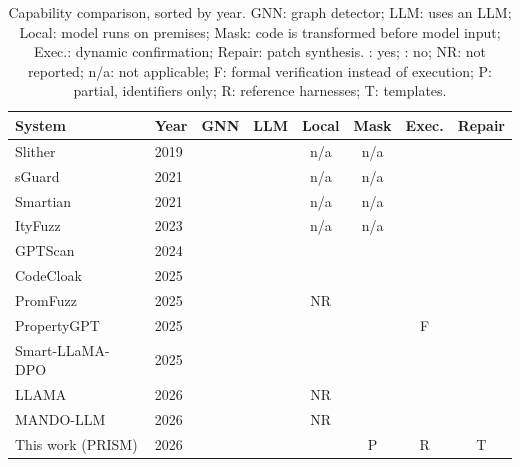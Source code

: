 \documentclass[runningheads]{llncs}
\newcommand{\cmark}{\ding{51}}
\newcommand{\xmark}{\ding{55}}
\begin{document}
\begin{table}[!b]
\centering
\small
\caption{Capability comparison, sorted by year. GNN: graph detector; LLM: uses an LLM; Local: model runs on premises; Mask: code is transformed before model input; Exec.: dynamic confirmation; Repair: patch synthesis. \cmark: yes; \xmark: no; NR: not reported; n/a: not applicable; F: formal verification instead of execution; P: partial, identifiers only; R: reference harnesses; T: templates.}
\label{tab:positioning}
\setlength{\tabcolsep}{4.5pt}
\begin{tabular}{llcccccc}
\toprule
System & Year & GNN & LLM & Local & Mask & Exec. & Repair \\
\midrule
Slither~\cite{feist2019slither}          & 2019 & \xmark & \xmark & n/a & n/a & \xmark & \xmark \\
sGuard~\cite{nguyen2021sguard}           & 2021 & \xmark & \xmark & n/a & n/a & \xmark & \cmark \\
Smartian~\cite{choi2021smartian}         & 2021 & \xmark & \xmark & n/a & n/a & \cmark & \xmark \\
ItyFuzz~\cite{shou2023ityfuzz}           & 2023 & \xmark & \xmark & n/a & n/a & \cmark & \xmark \\
GPTScan~\cite{sun2024gptscan}            & 2024 & \xmark & \cmark & \xmark & \xmark & \xmark & \xmark \\
CodeCloak~\cite{noah2025codecloak}    & 2025 & \xmark & \cmark & \xmark & \cmark & \xmark & \xmark \\
PromFuzz~\cite{lin2025promfuzz}          & 2025 & \xmark & \cmark & NR & \xmark & \cmark & \xmark \\
PropertyGPT~\cite{liu2024propertygpt}    & 2025 & \xmark & \cmark & \xmark & \xmark & F & \xmark \\
Smart-LLaMA-DPO~\cite{yu2025smart}  & 2025 & \xmark & \cmark & \cmark & \xmark & \xmark & \xmark \\
LLAMA~\cite{gai2026llama}                & 2026 & \xmark & \cmark & NR & \xmark & \cmark & \xmark \\
MANDO-LLM~\cite{nguyen2026mando}         & 2026 & \cmark & \cmark & NR & \xmark & \xmark & \xmark \\
This work (PRISM)                        & 2026 & \cmark & \cmark & \cmark & P & R & T \\
\bottomrule
\end{tabular}
\end{table}
\end{document}

